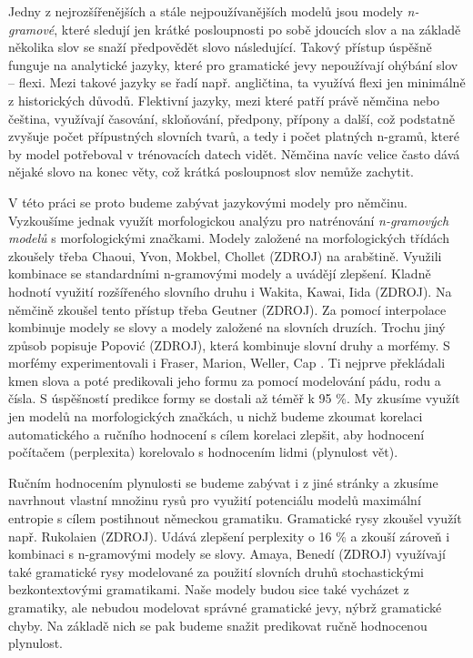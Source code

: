 \documentclass[12pt,a4paper]{report}
\begin{document}
Jedny z nejrozšířenějších a stále nejpoužívanějších modelů jsou modely \textit{n-gramové}, které sledují jen krátké posloupnosti po sobě jdoucích slov a na základě několika slov se snaží předpovědět slovo následující. Takový přístup úspěšně funguje na analytické jazyky, které pro gramatické jevy nepoužívají ohýbání slov -- flexi. Mezi takové jazyky se řadí např. angličtina, ta využívá flexi jen minimálně z historických důvodů. Flektivní jazyky, mezi které patří právě němčina nebo čeština, využívají časování, skloňování, předpony, přípony a další, což podstatně zvyšuje počet přípustných slovních tvarů, a tedy i počet platných n-gramů, které by model potřeboval v trénovacích datech vidět. Němčina navíc velice často dává nějaké slovo na konec věty, což krátká posloupnost slov nemůže zachytit.

V této práci se proto budeme zabývat jazykovými modely pro němčinu. Vyzkoušíme jednak využít morfologickou analýzu pro natrénování \textit{n-gramových modelů} s morfologickými značkami. Modely založené na morfologických třídách zkoušely třeba Chaoui, Yvon, Mokbel, Chollet (ZDROJ) na arabštině. Využili kombinace se standardními n-gramovými modely a uvádějí zlepšení. Kladně hodnotí využití rozšířeného slovního druhu i Wakita, Kawai, Iida (ZDROJ). Na němčině zkoušel tento přístup třeba Geutner (ZDROJ). Za pomocí interpolace kombinuje modely se slovy a modely založené na slovních druzích. Trochu jiný způsob popisuje Popović (ZDROJ), která kombinuje slovní druhy a morfémy. S morfémy experimentovali i Fraser, Marion, Weller, Cap \cite{fraser12}. Ti nejprve překládali kmen slova a poté predikovali jeho formu za pomocí modelování pádu, rodu a čísla. S úspěšností predikce formy se dostali až téměř k 95 \%. My zkusíme využít jen modelů na morfologických značkách, u nichž budeme zkoumat korelaci automatického a ručního hodnocení s cílem korelaci zlepšit, aby hodnocení počítačem (perplexita) korelovalo s hodnocením lidmi (plynulost vět).

Ručním hodnocením plynulosti se budeme zabývat i z jiné stránky a zkusíme navrhnout vlastní množinu rysů pro využití potenciálu modelů maximální entropie s cílem postihnout německou gramatiku. Gramatické rysy zkoušel využít např. Rukolaien (ZDROJ). Udává zlepšení perplexity o 16 \% a zkouší zároveň i kombinaci s n-gramovými modely se slovy. Amaya, Benedí (ZDROJ) využívají také gramatické rysy modelované za použití slovních druhů stochastickými bezkontextovými gramatikami. Naše modely budou sice také vycházet z gramatiky, ale nebudou modelovat správné gramatické jevy, nýbrž gramatické chyby. Na základě nich se pak budeme snažit predikovat ručně hodnocenou plynulost.
\end{document}
